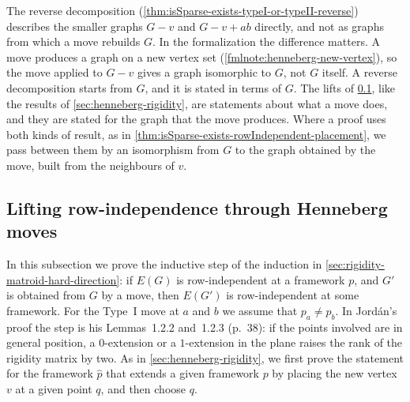 \begin{fmlnote}
  \label{fmlnote:reverse-vs-lift-form}
  The reverse decomposition
  (\cref{thm:isSparse-exists-typeI-or-typeII-reverse}) describes the
  smaller graphs $G - v$ and $G - v + ab$ directly, and not as graphs
  from which a move rebuilds $G$. In the formalization the difference
  matters. A move produces a graph on a new vertex set
  (\cref{fmlnote:henneberg-new-vertex}), so the move
  applied to $G - v$ gives a graph isomorphic to $G$, not $G$ itself.
  A reverse decomposition starts from $G$, and it is stated in terms of
  $G$. The lifts of \cref{sec:rigidity-matroid-lifts}, like the results
  of \cref{sec:henneberg-rigidity}, are statements about what a move
  does, and they are stated for the graph that the move produces. Where
  a proof uses both kinds of result, as in
  \cref{thm:isSparse-exists-rowIndependent-placement}, we pass between
  them by an isomorphism from $G$ to the graph obtained by the move,
  built from the neighbours of $v$.
\end{fmlnote}

\subsection{Lifting row-independence through Henneberg moves}
\label{sec:rigidity-matroid-lifts}

In this subsection we prove the inductive step of the induction in
\cref{sec:rigidity-matroid-hard-direction}: if $E(G)$ is
row-independent at a framework $p$, and $G'$ is obtained from $G$ by a
move, then $E(G')$ is row-independent at some framework. For the
Type~I move at $a$ and $b$ we assume that $p_a \ne p_b$. In Jord\'an's
proof the step is his Lemmas~1.2.2 and~1.2.3 (p.~38): if the points
involved are in general position, a $0$-extension or a $1$-extension
in the plane raises the rank of the rigidity matrix by two. As in
\cref{sec:henneberg-rigidity}, we first prove the statement for the
framework $\hat p$ that extends a given framework $p$ by placing the
new vertex $v$ at a given point $q$, and then choose $q$.

